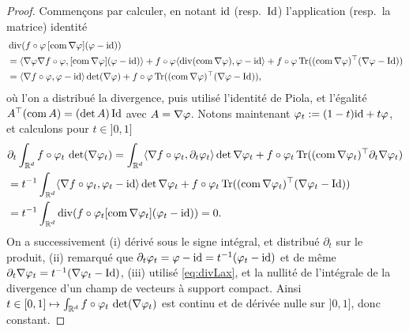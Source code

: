 \begin{proof}
	Commençons par calculer, en notant $\mathrm{id}$ (resp.\ $\operatorname{Id}$) l'application (resp.\ la matrice) identité
	\begin{align} \nonumber
		&\operatorname{div}( f\circ \varphi \, [\operatorname{com} \nabla \varphi]  (\varphi - \mathrm{id})) \\ \nonumber
		&= \langle\nabla \varphi \nabla f \circ \varphi, [\operatorname{com} \nabla \varphi] (\varphi-\mathrm{id})\rangle + f\circ \varphi \langle\operatorname{div} (\operatorname{com} \nabla \varphi), \varphi-\mathrm{id}\rangle + f\circ \varphi \operatorname{Tr}((\operatorname{com} \nabla \varphi)^\top  (\nabla \varphi - \operatorname{Id}))\\ \label{eq:divLax}
		&= \langle\nabla f \circ \varphi, \varphi-\mathrm{id}\rangle \det (\nabla \varphi) + f \circ \varphi \operatorname{Tr}((\operatorname{com} \nabla \varphi)^\top  (\nabla \varphi - \operatorname{Id})),
	\end{align}
	où l'on a distribué la divergence, puis utilisé l'identité de Piola, et l'égalité $A^\top (\operatorname{com} A) = (\det A) \operatorname{Id}$ avec $A = \nabla \varphi$.
	Notons maintenant $\varphi_t := (1-t) \mathrm{id} + t \varphi$, et calculons pour $t \in ]0,1]$
	\begin{align*}
		&\partial_t \int_{\mathbb{R}^d} f \circ \varphi_t \, \det (\nabla \varphi_t) 
		= \int_{\mathbb{R}^d} \langle\nabla f \circ \varphi_t, \partial_t \varphi_t\rangle \det \nabla \varphi_t + f \circ \varphi_t \operatorname{Tr}((\operatorname{com} \nabla \varphi_t)^\top \partial_t \nabla \varphi_t)\\
		&= t^{-1} \int_{\mathbb{R}^d} \langle\nabla f \circ \varphi_t, \varphi_t-\mathrm{id}\rangle \det \nabla \varphi_t + f \circ \varphi_t \operatorname{Tr}((\operatorname{com} \nabla \varphi_t)^\top (\nabla \varphi_t- \operatorname{Id}))\\
		&= t^{-1} \int_{\mathbb{R}^d} \operatorname{div}( f \circ \varphi_t [\operatorname{com} \nabla \varphi_t] (\varphi_t - \mathrm{id})) = 0.
	\end{align*}
	On a successivement (i) dérivé sous le signe intégral, et distribué $\partial_t$ sur le produit, (ii) remarqué que $\partial_t \varphi_t = \varphi-\mathrm{id} = t^{-1} (\varphi_t-\mathrm{id})$ et de même $\partial_t \nabla \varphi_t = t^{-1} (\nabla \varphi_t - \operatorname{Id})$, (iii) utilisé \eqref{eq:divLax}, et la nullité de l'intégrale de la divergence d'un champ de vecteurs à support compact. Ainsi $t\in [0,1] \mapsto \int_{\mathbb{R}^d} f \circ \varphi_t \, \det (\nabla \varphi_t)$ est continu et de dérivée nulle sur $]0,1]$, donc constant.
\end{proof}

